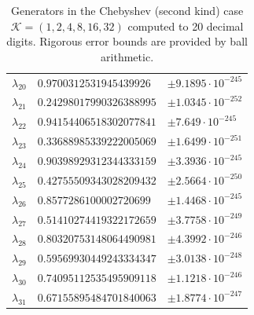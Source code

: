 \documentclass[a4paper,10pt]{article}
\begin{document}
\begin{appendix}
\begin{table}[h]
\begin{tabular}{|l|ll|}
  $\lambda_{20}$ & $0.9700312531945439926$   &  $\pm 9.1895 \cdot 10^{-245}$ \\
  $\lambda_{21}$ & $0.24298017990326388995$  &  $\pm 1.0345 \cdot 10^{-252}$ \\
  $\lambda_{22}$ & $0.94154406518302077841$  &  $\pm 7.649 \cdot 10^{-245}$ \\
  $\lambda_{23}$ & $0.33688985339222005069$  &  $\pm 1.6499 \cdot 10^{-251}$ \\
  $\lambda_{24}$ & $0.90398929312344333159$  &  $\pm 3.3936 \cdot 10^{-245}$ \\
  $\lambda_{25}$ & $0.42755509343028209432$  &  $\pm 2.5664 \cdot 10^{-250}$ \\
  $\lambda_{26}$ & $0.8577286100002720699$   &  $\pm 1.4468 \cdot 10^{-245}$ \\
  $\lambda_{27}$ & $0.51410274419322172659$  &  $\pm 3.7758 \cdot 10^{-249}$ \\
  $\lambda_{28}$ & $0.80320753148064490981$  &  $\pm 4.3992 \cdot 10^{-246}$ \\
  $\lambda_{29}$ & $0.59569930449243334347$  &  $\pm 3.0138 \cdot 10^{-248}$ \\
  $\lambda_{30}$ & $0.74095112535495909118$  &  $\pm 1.1218 \cdot 10^{-246}$ \\
  $\lambda_{31}$ & $0.67155895484701840063$  &  $\pm 1.8774 \cdot 10^{-247}$ \\
  \hline
  \end{tabular}
  \caption{Generators in the Chebyshev (second kind) case $\mathcal{K} = (1, 2, 4, 8, 16, 32)$
  computed to 20 decimal digits. Rigorous error bounds are provided by ball
  arithmetic.}
\end{table}


\end{appendix}
\end{document}
